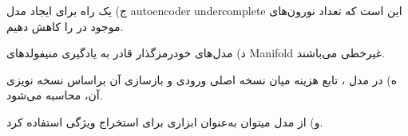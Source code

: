 \vspace{1cm}
ج) یک راه برای ایجاد مدل {autoencoder undercomplete} این است که تعداد نورون‌های موجود در  را کاهش دهیم.
\vspace{1cm}

د) مدل‌های خودرمزگذار قادر به یادگیری منیفولد‌های {Manifold} غیرخطی می‌باشند.
\vspace{1cm}

ه) در مدل  ، تابع هزینه میان نسخه اصلی ورودی و بازسازی آن براساس نسخه نویزی آن، محاسبه می‌شود.

\vspace{1cm}
و) از مدل  میتوان به‌عنوان ابزاری برای استخراج ویژگی استفاده کرد.
